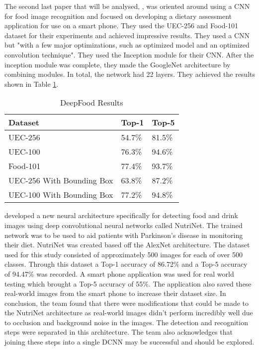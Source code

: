 The second last paper that will be analysed, \parencite{deepFood}, was oriented around using a CNN for food image recognition and focused on developing a dietary assessment
application for use on a smart phone. They used the UEC-256 and Food-101 dataset
for their experiments and achieved impressive results.
They used a CNN but "with a few major optimizations,
such as optimized model and an optimized convolution technique". 
They used the Inception module for their CNN. After the
inception module was complete, they made the GoogleNet architecture by combining modules. In
total, the network had 22 layers.
They achieved the results shown in Table \ref{resultsDeepFood}.

\begin{table}[h]
	\centering
	\caption{DeepFood Results}
	\label{resultsDeepFood}
	\begin{tabular}{|l|l|l|}
	\hline
		\textbf{Dataset} & \textbf{Top-1}  & \textbf{Top-5}  \\  \hline
		UEC-256                   & 54.7\% & 81.5\% \\ \hline
		UEC-100                   & 76.3\% & 94.6\% \\ \hline
		Food-101                  & 77.4\% & 93.7\% \\ \hline
		UEC-256 With Bounding Box & 63.8\% & 87.2\% \\ \hline
		  UEC-100 With Bounding Box & 77.2\% & 94.8\% \\ \hline
	\end{tabular}
\end{table}

\parencite{nutrinet} developed a new neural architecture specifically for detecting food and drink images using deep convolutional neural networks called NutriNet.
The trained network was to be used to aid patients with Parkinson's disease in monitoring their diet.
NutriNet was created based off the AlexNet architecture.
The dataset used for this study consisted of approximately 500 images for each of over 500 classes.
Through this dataset a Top-1 accuracy of 86.72\% and a Top-5 accuracy of 94.47\% was recorded.
A smart phone application was used for real world testing which brought a Top-5 accuracy of 55\%.
The application also saved these real-world images from the smart phone to increase their dataset size.
In conclusion, the team found that there were modifications that could be made to the NutriNet architecture as real-world images didn't perform incredibly well due to occlusion and background noise in the images.
The detection and recognition steps were separated in this architecture.
The team also acknowledges that joining these steps into a single DCNN may be successful and should be explored.

